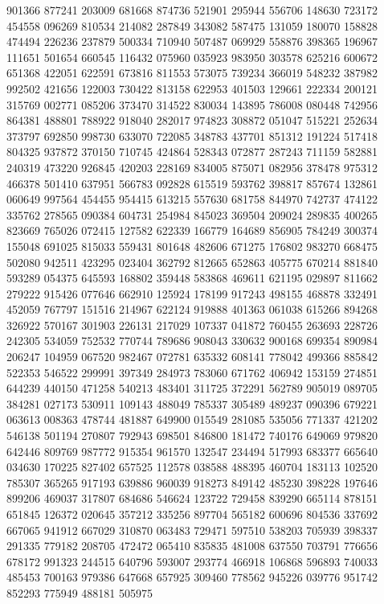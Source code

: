 {901366 877241 203009 681668 874736 521901 295944 556706 148630 723172 454558%
096269 810534 214082 287849 343082 587475 131059 180070 158828 474494 226236%
237879 500334 710940 507487 069929 558876 398365 196967 111651 501654 660545%
116432 075960 035923 983950 303578 625216 600672 651368 422051 622591 673816%
811553 573075 739234 366019 548232 387982 992502 421656 122003 730422 813158%
622953 401503 129661 222334 200121 315769 002771 085206 373470 314522 830034%
143895 786008 080448 742956 864381 488801 788922 918040 282017 974823 308872%
051047 515221 252634 373797 692850 998730 633070 722085 348783 437701 851312%
191224 517418 804325 937872 370150 710745 424864 528343 072877 287243 711159%
582881 240319 473220 926845 420203 228169 834005 875071 082956 378478 975312%
466378 501410 637951 566783 092828 615519 593762 398817 857674 132861 060649%
997564 454455 954415 613215 557630 681758 844970 742737 474122 335762 278565%
090384 604731 254984 845023 369504 209024 289835 400265 823669 765026 072415%
127582 622339 166779 164689 856905 784249 300374 155048 691025 815033 559431%
801648 482606 671275 176802 983270 668475 502080 942511 423295 023404 362792%
812665 652863 405775 670214 881840 593289 054375 645593 168802 359448 583868%
469611 621195 029897 811662 279222 915426 077646 662910 125924 178199 917243%
498155 468878 332491 452059 767797 151516 214967 622124 919888 401363 061038%
615266 894268 326922 570167 301903 226131 217029 107337 041872 760455 263693%
228726 242305 534059 752532 770744 789686 908043 330632 900168 699354 890984%
206247 104959 067520 982467 072781 635332 608141 778042 499366 885842 522353%
546522 299991 397349 284973 783060 671762 406942 153159 274851 644239 440150%
471258 540213 483401 311725 372291 562789 905019 089705 384281 027173 530911%
109143 488049 785337 305489 489237 090396 679221 063613 008363 478744 481887%
649900 015549 281085 535056 771337 421202 546138 501194 270807 792943 698501%
846800 181472 740176 649069 979820 642446 809769 987772 915354 961570 132547%
234494 517993 683377 665640 034630 170225 827402 657525 112578 038588 488395%
460704 183113 102520 785307 365265 917193 639886 960039 918273 849142 485230%
398228 197646 899206 469037 317807 684686 546624 123722 729458 839290 665114%
878151 651845 126372 020645 357212 335256 897704 565182 600696 804536 337692%
667065 941912 667029 310870 063483 729471 597510 538203 705939 398337 291335%
779182 208705 472472 065410 835835 481008 637550 703791 776656 678172 991323%
244515 640796 593007 293774 466918 106868 596893 740033 485453 700163 979386%
647668 657925 309460 778562 945226 039776 951742 852293 775949 488181 505975%
}
